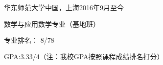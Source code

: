 
\begin{eduitem}{华东师范大学}{中国，上海}{2016年9月}{至今}
\item 数学与应用数学专业（基地班）
\item 专业排名： 8/78
\item GPA:3.33/4（注：我校GPA按照课程成绩排名打分）
\end{eduitem}



\endinput